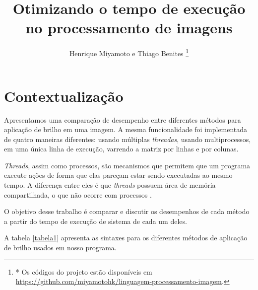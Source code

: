 \documentclass[a4paper, 10pt, conference]{ieeeconf}
\title{\LARGE \bf Otimizando o tempo de execução no processamento de imagens}
\author{Henrique Miyamoto e Thiago Benites \thanks{* Os códigos do projeto estão disponíveis em \url{https://github.com/miyamotohk/linguagem-processamento-imagem}.}}
\begin{document}
\maketitle
\thispagestyle{empty}
\pagestyle{empty}




\section{Contextualização}


Apresentamos uma comparação de desempenho entre diferentes métodos para aplicação de brilho em uma imagem. A mesma funcionalidade foi implementada de quatro maneiras diferentes: usando múltiplas \textit{threadas}, usando multiprocessos, em uma única linha de execução, varrendo a matriz por linhas e por colunas.

\textit{Threads}, assim como processos, são mecanismos que permitem que um programa execute ações de forma que elas pareçam estar sendo executadas ao mesmo tempo. A diferença entre eles é que \textit{threads} possuem área de memória compartilhada, o que não ocorre com processos \cite{alp}.

O objetivo desse trabalho é comparar e discutir os desempenhos de cada método a partir do tempo de execução de sistema de cada um deles.

A tabela \ref{tabela1} apresenta as sintaxes para os diferentes métodos de aplicação de brilho usados em nosso programa.
\end{document}
